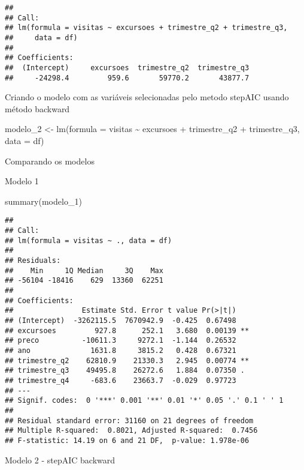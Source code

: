 \documentclass[
]{article}
\newenvironment{Shaded}{\begin{snugshade}}{\end{snugshade}}
\newcommand{\AttributeTok}[1]{\textcolor[rgb]{0.77,0.63,0.00}{#1}}
\newcommand{\FunctionTok}[1]{\textcolor[rgb]{0.00,0.00,0.00}{#1}}
\newcommand{\NormalTok}[1]{#1}
\newcommand{\OtherTok}[1]{\textcolor[rgb]{0.56,0.35,0.01}{#1}}
\newcommand{\SpecialCharTok}[1]{\textcolor[rgb]{0.00,0.00,0.00}{#1}}
\begin{document}
\begin{verbatim}
## 
## Call:
## lm(formula = visitas ~ excursoes + trimestre_q2 + trimestre_q3, 
##     data = df)
## 
## Coefficients:
##  (Intercept)     excursoes  trimestre_q2  trimestre_q3  
##     -24298.4         959.6       59770.2       43877.7
\end{verbatim}

Criando o modelo com as variáveis selecionadas pelo metodo stepAIC
usando método backward

\begin{Shaded}
\begin{Highlighting}[]
\NormalTok{modelo\_2  }\OtherTok{\textless{}{-}} \FunctionTok{lm}\NormalTok{(}\AttributeTok{formula =}\NormalTok{ visitas }\SpecialCharTok{\textasciitilde{}}\NormalTok{ excursoes }\SpecialCharTok{+}\NormalTok{ trimestre\_q2 }\SpecialCharTok{+}\NormalTok{ trimestre\_q3, }
                  \AttributeTok{data =}\NormalTok{ df)}
\end{Highlighting}
\end{Shaded}

Comparando os modelos

Modelo 1

\begin{Shaded}
\begin{Highlighting}[]
\FunctionTok{summary}\NormalTok{(modelo\_1)}
\end{Highlighting}
\end{Shaded}

\begin{verbatim}
## 
## Call:
## lm(formula = visitas ~ ., data = df)
## 
## Residuals:
##    Min     1Q Median     3Q    Max 
## -56104 -18416    629  13360  62251 
## 
## Coefficients:
##                Estimate Std. Error t value Pr(>|t|)   
## (Intercept)  -3262115.5  7670942.9  -0.425  0.67498   
## excursoes         927.8      252.1   3.680  0.00139 **
## preco          -10611.3     9272.1  -1.144  0.26532   
## ano              1631.8     3815.2   0.428  0.67321   
## trimestre_q2    62810.9    21330.3   2.945  0.00774 **
## trimestre_q3    49495.8    26272.6   1.884  0.07350 . 
## trimestre_q4     -683.6    23663.7  -0.029  0.97723   
## ---
## Signif. codes:  0 '***' 0.001 '**' 0.01 '*' 0.05 '.' 0.1 ' ' 1
## 
## Residual standard error: 31160 on 21 degrees of freedom
## Multiple R-squared:  0.8021, Adjusted R-squared:  0.7456 
## F-statistic: 14.19 on 6 and 21 DF,  p-value: 1.978e-06
\end{verbatim}

Modelo 2 - stepAIC backward
\end{document}
